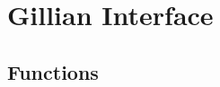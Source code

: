 \chapter{Gillian Interface}

\section{ Functions}

\newcommand{\subcd}[1]{\scriptsize\color[HTML]{777777}\code{#1}}
\newenvironment{subcdd}
  {\par\scriptsize}
  {\par\addvspace{\bigskipamount}}

\newcommand{\rowS}[2]{
    \makecell[l]{\code{#1}} & #2 \\\hline
}
\newcommand{\rowM}[3]{
    \makecell[l]{
      \vspace{-0.1cm}\code{#1}\\\subcd{#2}
    } & #3 \\\hline}
\newcommand{\rowL}[4]{
    \makecell[l]{
      \vspace{-0.1cm}\code{#1}\\
      \vspace{-0.15cm}\subcd{#2}\\\subcd{#3}
     } \par& #4 \\\hline}
\newcommand{\rowXL}[5]{
    \makecell[l]{
      \vspace{-0.1cm}\code{#1}\\
      \vspace{-0.15cm}\subcd{#2}\\\vspace{-0.15cm}\subcd{#3}\\\subcd{#4}
     } & #5 \\\hline}
\newcommand{\qstn}[1]{{\small\color{red}{#1}}}
\newcommand{\unsure}{\qstn{(?)}~}


